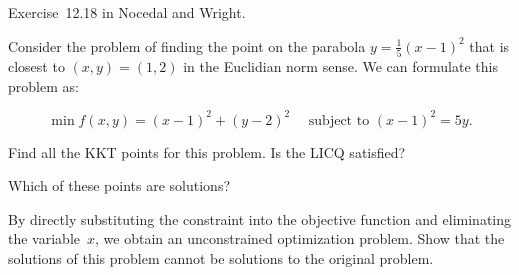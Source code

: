\begin{problem}\label{prob:05}%
  Exercise~12.18 in Nocedal and Wright.
  
  Consider the problem of finding the point on the parabola $y=\frac{1}{5}(x-1)^{2}$ that is closest to $(x,y)=(1,2)$ in the Euclidian norm sense.  We can formulate this problem as:
  
  \[\min f(x,y)=(x-1)^2  + (y-2)^2 ~~~~~~ \text{subject to } (x-1)^2 = 5y \text{.} \]
\end{problem}

\begin{subproblem}
  Find all the KKT points for this problem.  Is the LICQ satisfied?
\end{subproblem}

\begin{subproblem}
  Which of these points are solutions?
\end{subproblem}

\begin{subproblem}
  By directly substituting the constraint into the objective function and eliminating the variable~$x$, we obtain an unconstrained optimization problem.  Show that the solutions of this problem cannot be solutions to the original problem.
\end{subproblem}




